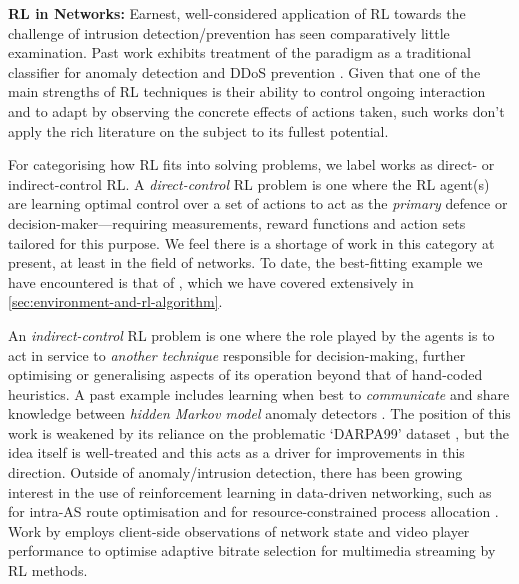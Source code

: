 \documentclass[conference, letterpaper, 10pt, times]{IEEEtran}
\newcommand{\fakepara}[1]{\noindent\textbf{#1:}}
\begin{document}
\fakepara{RL in Networks}
Earnest, well-considered application of RL towards the challenge of intrusion detection/prevention has seen comparatively little examination.
Past work exhibits treatment of the paradigm as a traditional classifier for anomaly detection \cite{shamshirband2014anomaly} and DDoS prevention \cite{DBLP:conf/mates/ServinK08}.
Given that one of the main strengths of RL techniques is their ability to control ongoing interaction and to adapt by observing the concrete effects of actions taken, such works don't apply the rich literature on the subject to its fullest potential.

For categorising how RL fits into solving problems, we label works as direct- or indirect-control RL.
A \emph{direct-control} RL problem is one where the RL agent(s) are learning optimal control over a set of actions to act as the \emph{primary} defence or decision-maker---requiring measurements, reward functions and action sets tailored for this purpose.
We feel there is a shortage of work in this category at present, at least in the field of networks.
To date, the best-fitting example we have encountered is that of \textcite{DBLP:journals/eaai/MalialisK15}, which we have covered extensively in \cref{sec:environment-and-rl-algorithm}.

An \emph{indirect-control} RL problem is one where the role played by the agents is to act in service to \emph{another technique} responsible for decision-making, further optimising or generalising aspects of its operation beyond that of hand-coded heuristics.
A past example includes learning when best to \emph{communicate} and share knowledge between \emph{hidden Markov model} anomaly detectors \cite{DBLP:conf/paisi/XuSH07}.
The position of this work is weakened by its reliance on the problematic `DARPA99' dataset \cite{DARPA-IDD, DBLP:conf/cisda/TavallaeeBLG09, DBLP:conf/sp/SommerP10}, but the idea itself is well-treated and this acts as a driver for improvements in this direction.
Outside of anomaly/intrusion detection, there has been growing interest in the use of reinforcement learning in data-driven networking, such as for intra-AS route optimisation \cite{DBLP:conf/hotnets/ValadarskySST17} and for resource-constrained process allocation \cite{DBLP:conf/hotnets/MaoAMK16}.
Work by \textcite{DBLP:conf/sigcomm/MaoNA17} employs client-side observations of network state and video player performance to optimise adaptive bitrate selection for multimedia streaming by RL methods.
\end{document}

